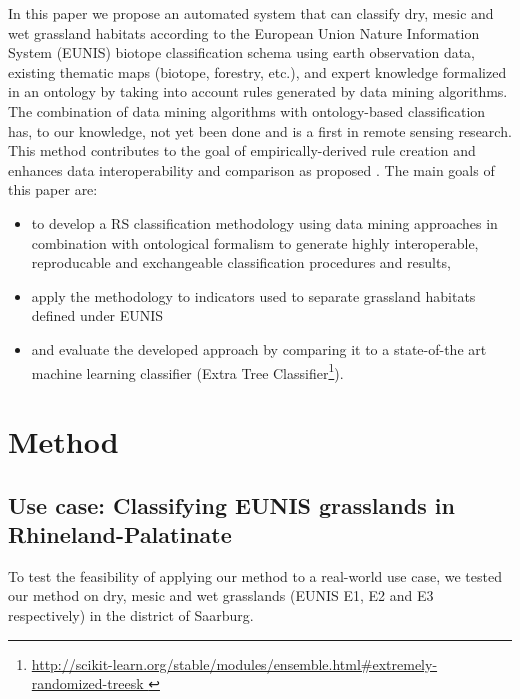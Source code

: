\documentclass[authoryear, review,12pt,number]{elsarticle}
\begin{document}
In this paper we propose an automated system that can classify dry, mesic and
wet grassland habitats according to the European Union Nature Information System
(EUNIS) biotope classification schema using earth observation data, existing
thematic maps (biotope, forestry, etc.), and expert knowledge formalized in an
ontology by taking into account rules generated by data mining algorithms. The
combination of data mining algorithms with ontology-based classification has, to
our knowledge, not yet been done and is a first in remote sensing research.
This method contributes to the goal of empirically-derived rule creation and
enhances data interoperability and comparison as proposed \cite{Janowicz2012}.
The main goals of this paper are:
\begin{itemize}
 \item to develop a RS classification methodology using data mining approaches
     in combination with ontological formalism to generate highly interoperable,
     reproducable and exchangeable classification procedures and results,
 \item apply the methodology to indicators used to separate grassland habitats
     defined under EUNIS
 \item and evaluate the developed approach by comparing it to a state-of-the art
     machine learning classifier (Extra Tree 
Classifier\footnote{\url{
http://scikit-learn.org/stable/modules/ensemble.html#extremely-randomized-treesk
}}).
\end{itemize}
\section{Method}
\subsection{Use case: Classifying EUNIS grasslands in Rhineland-Palatinate}
\label{sec:usecase_data}
To test the feasibility of applying our method to a real-world use case, we 
tested our method on dry, mesic and wet grasslands (EUNIS E1, E2 and E3 
respectively) in the district of Saarburg. 
\end{document}
